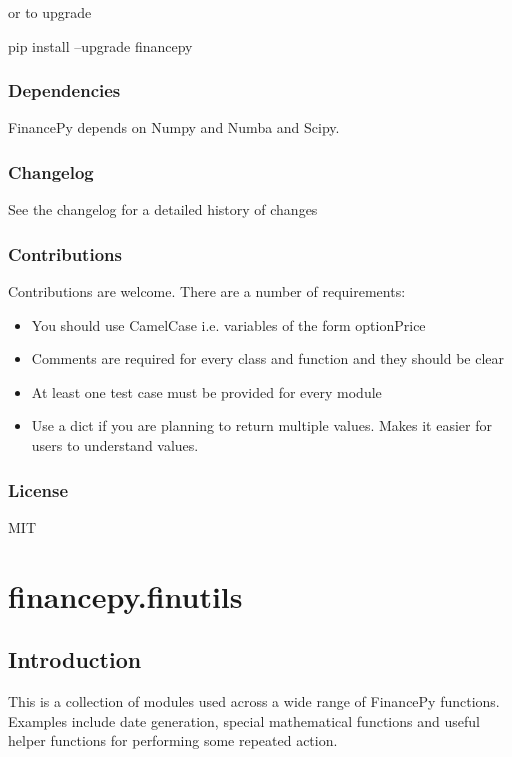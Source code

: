 \documentclass[twoside,11pt]{book}
\begin{document}
or to upgrade

pip install --upgrade financepy


\subsection*{Dependencies}

FinancePy depends on Numpy and Numba and Scipy.



\subsection*{Changelog}

See the changelog for a detailed history of changes


\subsection*{Contributions}

Contributions are welcome. There are a number of requirements:

\begin{itemize}
\item{ You should use CamelCase i.e. variables of the form optionPrice
}
\item{ Comments are required for every class and function and they should be clear
}
\item{ At least one test case must be provided for every module
}
\item{ Use a dict if you are planning to return multiple values. Makes it easier for users to understand values.
}
\end{itemize}


\subsection*{License}

MIT

\chapter{financepy.finutils}
\section{Introduction}

This is a collection of modules used across a wide range of FinancePy functions. Examples include date generation, special mathematical functions and useful helper functions for performing some repeated action.
\end{document}
